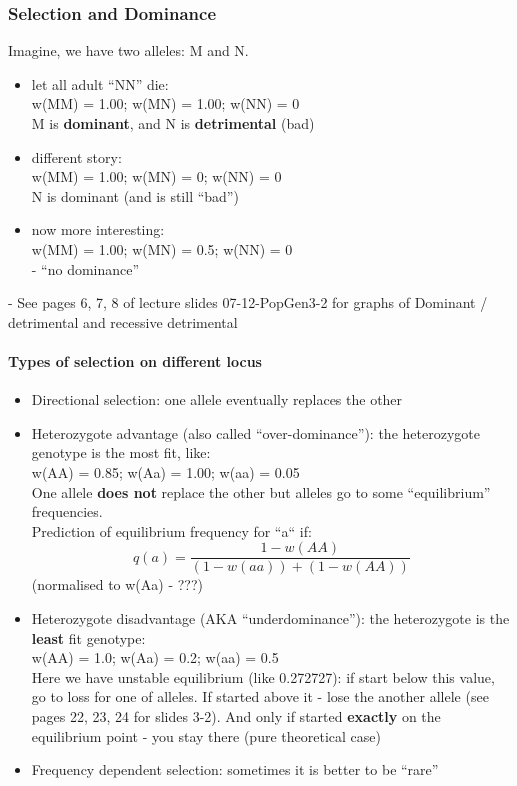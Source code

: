 \documentclass{scrartcl}
\begin{document}
\subsubsection{Selection and Dominance}
\label{07-02-01}
Imagine, we have two alleles: M and N.
\begin{itemize}
\item let all adult ``NN'' die:\\
w(MM) = 1.00; w(MN) = 1.00; w(NN) = 0\\
M is {\bf dominant}, and N is {\bf detrimental} (bad)
\item different story:\\
w(MM) = 1.00; w(MN) = 0; w(NN) = 0\\
N is dominant (and is still ``bad'')
\item now more interesting:\\
w(MM) = 1.00; w(MN) = 0.5; w(NN) = 0\\
- ``no dominance''
\end{itemize}
- See pages 6, 7, 8 of lecture slides 07-12-PopGen3-2 for graphs of Dominant / detrimental and recessive detrimental\\
\paragraph{Types of selection on different locus}

\begin{itemize}
\item Directional selection: one allele eventually replaces the other
\item Heterozygote advantage (also called ``over-dominance''): the heterozygote genotype is the most fit, like:\\
w(AA) = 0.85; w(Aa) = 1.00; w(aa) = 0.05\\
One allele {\bf does not} replace the other but alleles go to some ``equilibrium'' frequencies.\\
Prediction of equilibrium frequency for ``a`` if:\\
$$q(a) = \frac{1 - w(AA)}{(1-w(aa)) + (1-w(AA))} $$
(normalised to w(Aa) - ???)

\item Heterozygote disadvantage (AKA ``underdominance''): the heterozygote is the {\bf least} fit genotype:\\
w(AA) = 1.0; w(Aa) = 0.2; w(aa) = 0.5\\
Here we have unstable equilibrium (like 0.272727): if start below this value, go to loss for one of alleles. If started above it - lose the another allele (see pages 22, 23, 24 for slides 3-2).
And only if started {\bf exactly} on the equilibrium point - you stay there (pure theoretical case)
\item Frequency dependent selection: sometimes it is better to be ``rare''
\end{itemize}
\end{document}
